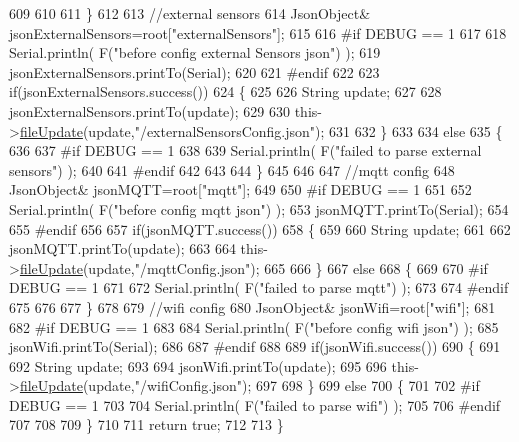 \begin{DoxyCode}
609 
610 
611     \}
612     
613     \textcolor{comment}{//external sensors}
614         JsonObject& jsonExternalSensors=root[\textcolor{stringliteral}{"externalSensors"}];
615 
616 \textcolor{preprocessor}{#if DEBUG == 1 }
617 
618     Serial.println( F(\textcolor{stringliteral}{"before config external Sensors json"}) );
619     jsonExternalSensors.printTo(Serial);
620 
621 \textcolor{preprocessor}{#endif}
622 
623     \textcolor{keywordflow}{if}(jsonExternalSensors.success())
624     \{
625 
626         String update;
627     
628         jsonExternalSensors.printTo(update);
629 
630         this->\hyperlink{classCoolFileSystem_a13f2958f5b87757c31fc53797a30d23a}{fileUpdate}(update,\textcolor{stringliteral}{"/externalSensorsConfig.json"});       
631 
632     \}
633 
634     \textcolor{keywordflow}{else}
635     \{   
636 
637 \textcolor{preprocessor}{    #if DEBUG == 1}
638         
639         Serial.println( F(\textcolor{stringliteral}{"failed to parse external sensors"}) );
640 
641 \textcolor{preprocessor}{    #endif}
642 
643 
644     \}
645 
646     
647     \textcolor{comment}{//mqtt config}
648         JsonObject& jsonMQTT=root[\textcolor{stringliteral}{"mqtt"}];
649     
650 \textcolor{preprocessor}{#if DEBUG == 1 }
651 
652     Serial.println( F(\textcolor{stringliteral}{"before config mqtt json"}) );
653     jsonMQTT.printTo(Serial);
654 
655 \textcolor{preprocessor}{#endif}
656 
657     \textcolor{keywordflow}{if}(jsonMQTT.success())
658     \{
659 
660         String update;
661     
662         jsonMQTT.printTo(update);
663 
664         this->\hyperlink{classCoolFileSystem_a13f2958f5b87757c31fc53797a30d23a}{fileUpdate}(update,\textcolor{stringliteral}{"/mqttConfig.json"});      
665 
666     \}
667     \textcolor{keywordflow}{else}
668     \{
669 
670 \textcolor{preprocessor}{    #if DEBUG == 1 }
671 
672         Serial.println( F(\textcolor{stringliteral}{"failed to parse mqtt"}) );
673     
674 \textcolor{preprocessor}{    #endif}
675 
676     
677     \}   
678 
679     \textcolor{comment}{//wifi config}
680         JsonObject& jsonWifi=root[\textcolor{stringliteral}{"wifi"}];
681     
682 \textcolor{preprocessor}{#if DEBUG == 1 }
683 
684     Serial.println( F(\textcolor{stringliteral}{"before config wifi json"}) );
685     jsonWifi.printTo(Serial);
686 
687 \textcolor{preprocessor}{#endif}
688 
689     \textcolor{keywordflow}{if}(jsonWifi.success())
690     \{
691 
692         String update;
693     
694         jsonWifi.printTo(update);
695 
696         this->\hyperlink{classCoolFileSystem_a13f2958f5b87757c31fc53797a30d23a}{fileUpdate}(update,\textcolor{stringliteral}{"/wifiConfig.json"});      
697 
698     \}
699     \textcolor{keywordflow}{else}
700     \{
701 
702 \textcolor{preprocessor}{    #if DEBUG == 1 }
703 
704         Serial.println( F(\textcolor{stringliteral}{"failed to parse wifi"}) );
705     
706 \textcolor{preprocessor}{    #endif}
707 
708     
709     \}   
710         
711     \textcolor{keywordflow}{return} \textcolor{keyword}{true};
712 
713 \}   
\end{DoxyCode}
